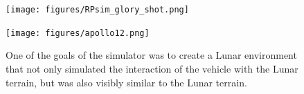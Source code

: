 \documentclass[twocolumn,letterpaper]{IEEEAerospaceCLS}  %
\begin{document}
\begin{figure}[htp]
\begin{subfloat}{
\texttt{[image: figures/RPsim\_glory\_shot.png]}
}
\end{subfloat}
\qquad
\begin{subfloat}{
\texttt{[image: figures/apollo12.png]}
}
\end{subfloat}
\caption{One of the goals of the simulator was to create a Lunar environment that not only simulated the interaction of the vehicle with the Lunar terrain, but was also visibly similar to the Lunar terrain.\label{fig:sim-by-real}}
\end{figure}

\tableofcontents

\end{document}
